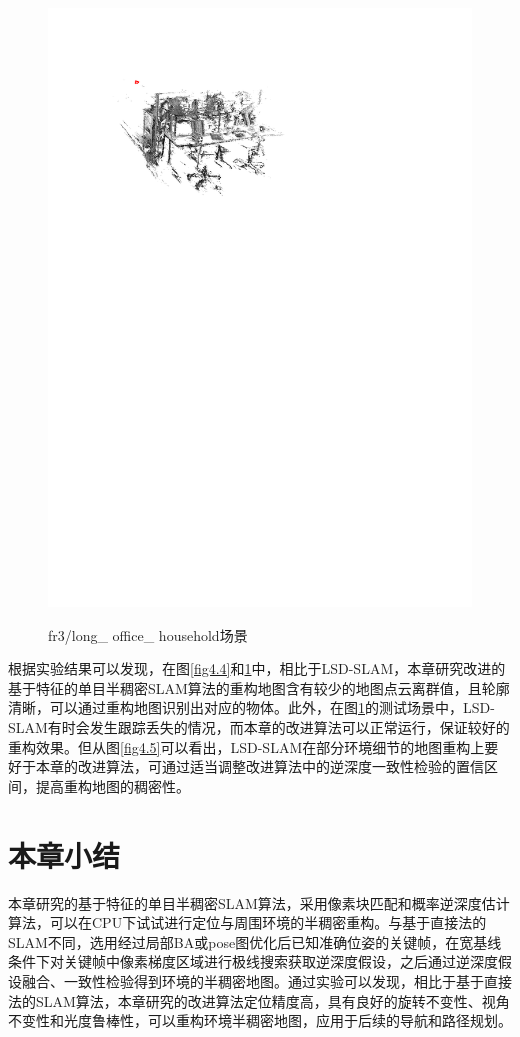 \begin{figure}
{          \includegraphics[scale=0.8]{figures/Fig4-6_b.pdf}
          }
     \caption{fr3/long\_ office\_ household场景}
\label{fig4.6}
\end{figure}

根据实验结果可以发现，在图\ref{fig4.4}和\ref{fig4.6}中，相比于LSD-SLAM，本章研究改进的基于特征的单目半稠密SLAM算法的重构地图含有较少的地图点云离群值，且轮廓清晰，可以通过重构地图识别出对应的物体。此外，在图\ref{fig4.6}的测试场景中，LSD-SLAM有时会发生跟踪丢失的情况，而本章的改进算法可以正常运行，保证较好的重构效果。但从图\ref{fig4.5}可以看出，LSD-SLAM在部分环境细节的地图重构上要好于本章的改进算法，可通过适当调整改进算法中的逆深度一致性检验的置信区间，提高重构地图的稠密性。

\section{本章小结}
本章研究的基于特征的单目半稠密SLAM算法，采用像素块匹配和概率逆深度估计算法，可以在CPU下试试进行定位与周围环境的半稠密重构。与基于直接法的SLAM不同，选用经过局部BA或pose图优化后已知准确位姿的关键帧，在宽基线条件下对关键帧中像素梯度区域进行极线搜索获取逆深度假设，之后通过逆深度假设融合、一致性检验得到环境的半稠密地图。通过实验可以发现，相比于基于直接法的SLAM算法，本章研究的改进算法定位精度高，具有良好的旋转不变性、视角不变性和光度鲁棒性，可以重构环境半稠密地图，应用于后续的导航和路径规划。






